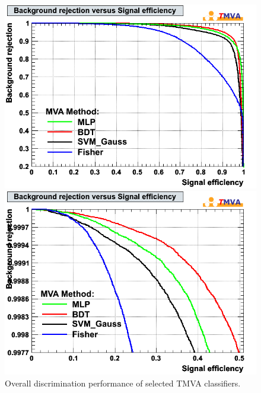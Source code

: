 \documentclass[a4paper]{jpconf}
\begin{document}
\begin{figure}[h]
 \begin{minipage}{8.0cm}
\includegraphics[width=1.0\textwidth]{images/mk_roc.png}
\end{minipage}
 \hfill
\begin{minipage}{8.0cm}
\includegraphics[width=1.0\textwidth]{images/mk_roc_zoomed.png}
\end{minipage}

\caption{Overall discrimination performance of selected TMVA classifiers.}
\label{fig:roc}
\end{figure}
\end{document}
